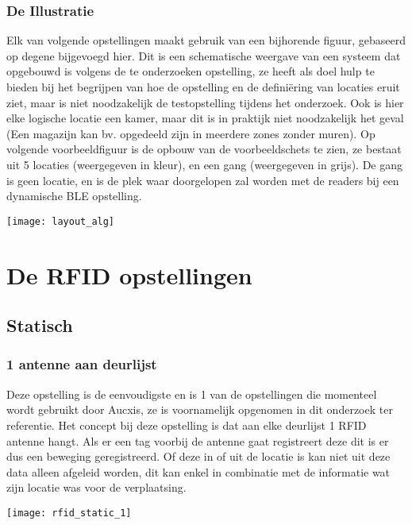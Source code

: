 \subsubsection{De Illustratie}
\begin{minipage}{0.65\textwidth}
Elk van volgende opstellingen maakt gebruik van een bijhorende figuur, gebaseerd op degene bijgevoegd hier. Dit is een schematische weergave van een systeem dat opgebouwd is volgens de te onderzoeken opstelling, ze heeft als doel hulp te bieden bij het begrijpen van hoe de opstelling en de definiëring van locaties eruit ziet, maar is niet noodzakelijk de testopstelling tijdens het onderzoek. Ook is hier elke logische locatie een kamer, maar dit is in praktijk niet noodzakelijk het geval (Een magazijn kan bv. opgedeeld zijn in meerdere zones zonder muren). Op volgende voorbeeldfiguur is de opbouw van de voorbeeldschets te zien, ze bestaat uit 5 locaties (weergegeven in kleur), en een gang (weergegeven in grijs). De gang is geen locatie, en is de plek waar doorgelopen zal worden met de readers bij een dynamische BLE opstelling.
\end{minipage}
\hfill
\begin{minipage}{0.30\textwidth}
	\texttt{[image: layout\_alg]}
\end{minipage}

\section[RFID]{De RFID opstellingen}
\label{ch:rfid}

\subsection{Statisch}

\subsubsection{1 antenne aan deurlijst}
\begin{minipage}{0.65\textwidth}
Deze opstelling is de eenvoudigste en is 1 van de opstellingen die momenteel wordt gebruikt door Aucxis, ze is voornamelijk opgenomen in dit onderzoek ter referentie. Het concept bij deze opstelling is dat aan elke deurlijst 1 RFID antenne hangt. Als er een tag voorbij de antenne gaat registreert deze dit is er dus een beweging geregistreerd. Of deze in of uit de locatie is kan niet uit deze data alleen afgeleid worden, dit kan enkel in combinatie met de informatie wat zijn locatie was voor de verplaatsing. 
\end{minipage}
\hfill
\begin{minipage}{0.30\textwidth}
	\texttt{[image: rfid\_static\_1]}
\end{minipage}

